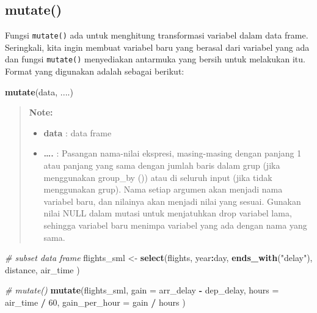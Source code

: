 \documentclass[]{book}
\newenvironment{Shaded}{\begin{snugshade}}{\end{snugshade}}
\newcommand{\KeywordTok}[1]{\textcolor[rgb]{0.13,0.29,0.53}{\textbf{#1}}}
\newcommand{\DataTypeTok}[1]{\textcolor[rgb]{0.13,0.29,0.53}{#1}}
\newcommand{\DecValTok}[1]{\textcolor[rgb]{0.00,0.00,0.81}{#1}}
\newcommand{\StringTok}[1]{\textcolor[rgb]{0.31,0.60,0.02}{#1}}
\newcommand{\CommentTok}[1]{\textcolor[rgb]{0.56,0.35,0.01}{\textit{#1}}}
\newcommand{\OperatorTok}[1]{\textcolor[rgb]{0.81,0.36,0.00}{\textbf{#1}}}
\newcommand{\NormalTok}[1]{#1}
\providecommand{\tightlist}{%
  \setlength{\itemsep}{0pt}\setlength{\parskip}{0pt}}
\begin{document}
\subsection{mutate()}\label{mutate}

Fungsi \texttt{mutate()} ada untuk menghitung transformasi variabel
dalam data frame. Seringkali, kita ingin membuat variabel baru yang
berasal dari variabel yang ada dan fungsi \texttt{mutate()} menyediakan
antarmuka yang bersih untuk melakukan itu. Format yang digunakan adalah
sebagai berikut:

\begin{Shaded}
\begin{Highlighting}[]
\KeywordTok{mutate}\NormalTok{(data, ....)}
\end{Highlighting}
\end{Shaded}

\begin{quote}
\textbf{Note: }

\begin{itemize}
\tightlist
\item
  \textbf{data} : data frame
\item
  \textbf{\ldots{}.} : Pasangan nama-nilai ekspresi, masing-masing
  dengan panjang 1 atau panjang yang sama dengan jumlah baris dalam grup
  (jika menggunakan group\_by ()) atau di seluruh input (jika tidak
  menggunakan grup). Nama setiap argumen akan menjadi nama variabel
  baru, dan nilainya akan menjadi nilai yang sesuai. Gunakan nilai NULL
  dalam mutasi untuk menjatuhkan drop variabel lama, sehingga variabel
  baru menimpa variabel yang ada dengan nama yang sama.
\end{itemize}
\end{quote}

\begin{Shaded}
\begin{Highlighting}[]
\CommentTok{# subset data frame}
\NormalTok{flights_sml <-}\StringTok{ }\KeywordTok{select}\NormalTok{(flights,}
\NormalTok{  year}\OperatorTok{:}\NormalTok{day,}
  \KeywordTok{ends_with}\NormalTok{(}\StringTok{"delay"}\NormalTok{),}
\NormalTok{  distance,}
\NormalTok{  air_time}
\NormalTok{)}

\CommentTok{# mutate()}
\KeywordTok{mutate}\NormalTok{(flights_sml,}
  \DataTypeTok{gain =}\NormalTok{ arr_delay }\OperatorTok{-}\StringTok{ }\NormalTok{dep_delay,}
  \DataTypeTok{hours =}\NormalTok{ air_time }\OperatorTok{/}\StringTok{ }\DecValTok{60}\NormalTok{,}
  \DataTypeTok{gain_per_hour =}\NormalTok{ gain }\OperatorTok{/}\StringTok{ }\NormalTok{hours}
\NormalTok{)}
\end{Highlighting}
\end{Shaded}
\end{document}
